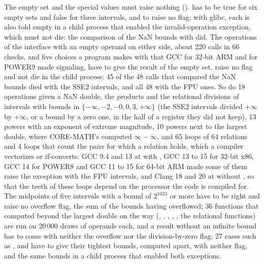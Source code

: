 \documentclass[12pt,a4paper,twoside,openright]{book}
\begin{document}
\medskip
The empty set and the special values must raise nothing
().  has to be true for six
empty sets and false for three intervals, and to raise no flag; with glibc,
each is also told empty in a child process that enabled the
invalid-operation exception, which must not die: the comparison of the NaN
bounds with \code{<=} did. The operations of the interface with an empty
operand on either side, about 220 calls in 66 checks, and five choices a
program makes with  that GCC for 32-bit ARM and for POWER9
made signaling, have to give the result of the empty set, raise no flag and
not die in the child process: 45 of the 48 calls that compared the NaN
bounds died with the SSE2 intervals, and all 48 with the FPU
ones.\newinvfive{} So do 18 operations given a NaN double, the products and
the relational divisions of intervals with bounds in
$\{-\infty, -2, -0, 0, 3, +\infty\}$ (the SSE2 intervals divided $+\infty$
by $+\infty$, or a bound by a zero one, in the half of a register they did
not keep), 13 powers with an exponent of extreme magnitude, 10 powers next to
the largest double, where CORE-MATH's  computed $\infty-\infty$,
and 65 loops of 64 relations and 4 loops that count the pairs for which a
relation holds, which a compiler vectorizes or if-converts: GCC 9.4 and 13 at
 with , GCC 13 to 15 for 32-bit x86, GCC 14 for
POWER8 and GCC 11 to 15 for 64-bit ARM made some of them raise the
exception with the FPU intervals, and Clang 18 and 20 at
 without , so that the
teeth of these loops depend on the processor the code is compiled for. The
midpoints of five intervals with a bound of $2^{1023}$ or more have to be
right and raise no overflow flag, the sum of the bounds having overflowed;
36 functions that computed beyond the largest double on the way
(, , , ,
, the relational functions) are run on 20\,000 draws of operands
each, and a result without an infinite bound has to come with neither the
overflow nor the division-by-zero flag;\newinvfive{} 27 cases such as
,  and
 have to give their tightest
bounds, computed apart, with neither flag, and the same bounds in a child
process that enabled both exceptions.
\end{document}
